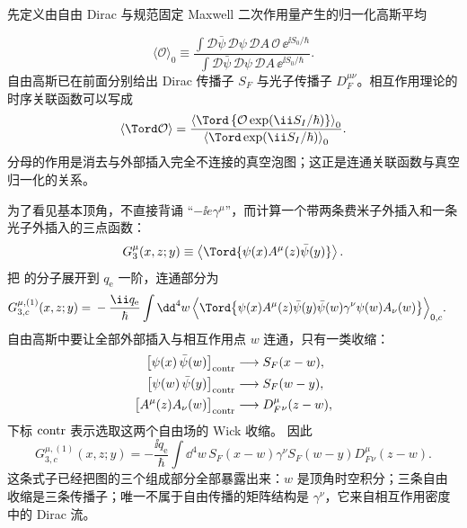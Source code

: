 \begin{derivation}[高斯平均中的传播子与顶角规则]
先定义由自由 Dirac 与规范固定 Maxwell 二次作用量产生的归一化高斯平均

\begin{equation*}
 \langle\mathcal O\rangle_0
 \equiv
 \frac{\displaystyle
 \int\mathcal D\bar\psi\,\mathcal D\psi\,\mathcal DA\,
 \mathcal O\,\ee^{\ii S_0/\hbar}}
 {\displaystyle
 \int\mathcal D\bar\psi\,\mathcal D\psi\,\mathcal DA\,
 \ee^{\ii S_0/\hbar}}.
 \end{equation*}
自由高斯已在前面分别给出 Dirac 传播子 $S_F$ 与光子传播子 $D_F^{\mu\nu}$。相互作用理论的时序关联函数可以写成
\begin{equation*}
 {
 \langle\Tord\mathcal O\rangle
 =\frac{
 \left\langle\Tord\left\{\mathcal O
 \exp\!\left(\ii S_I/\hbar\right)\right\}\right\rangle_0}
 {\left\langle\Tord\exp\!\left(\ii S_I/\hbar\right)\right\rangle_0}.}
 \end{equation*}
分母的作用是消去与外部插入完全不连接的真空泡图；这正是连通关联函数与真空归一化的关系。

为了看见基本顶角，不直接背诵 ``$-\ii e\gamma^\mu$''，而计算一个带两条费米子外插入和一条光子外插入的三点函数：
\begin{equation*}
 G_3^\mu(x,z;y)
 \equiv
 \left\langle
 \Tord\{\psi(x)A^\mu(z)\bar\psi(y)\}
 \right\rangle .
 \end{equation*}
把 的分子展开到 $q_{\mathrm e}$ 一阶，连通部分为
\begin{align*}
 G_{3,c}^{\mu,(1)}(x,z;y)
 ={}&-\frac{\ii q_{\mathrm e}}{\hbar}
 \int\dd^4 w\,
 \Big\langle\Tord\big\{
 \psi(x)A^\mu(z)\bar\psi(y)
 \bar\psi(w)\gamma^\nu\psi(w)A_\nu(w)
 \big\}\Big\rangle_{0,c}.
 \end{align*}
自由高斯中要让全部外部插入与相互作用点 $w$ 连通，只有一类收缩：
\begin{align*}
 \bigl[\psi(x)\,\bar\psi(w)\bigr]_{\rm contr}&\longrightarrow S_F(x-w),\\
 \bigl[\psi(w)\,\bar\psi(y)\bigr]_{\rm contr}&\longrightarrow S_F(w-y),\\
 \bigl[A^\mu(z)A_\nu(w)\bigr]_{\rm contr}&\longrightarrow D_F^{\mu}{}_{\nu}(z-w),
\end{align*}
下标 $\rm contr$ 表示选取这两个自由场的 Wick 收缩。
因此
\begin{equation*}
 {
 G_{3,c}^{\mu,(1)}(x,z;y)
 =-\frac{\ii q_{\mathrm e}}{\hbar}
 \int\dd^4 w\,
 S_F(x-w)\gamma^\nu S_F(w-y)
 D_F^{\mu}{}_{\nu}(z-w).}
 \end{equation*}
这条式子已经把图的三个组成部分全部暴露出来：$w$ 是顶角时空积分；三条自由收缩是三条传播子；唯一不属于自由传播的矩阵结构是 $\gamma^\nu$，它来自相互作用密度中的 Dirac 流。


\end{derivation}
